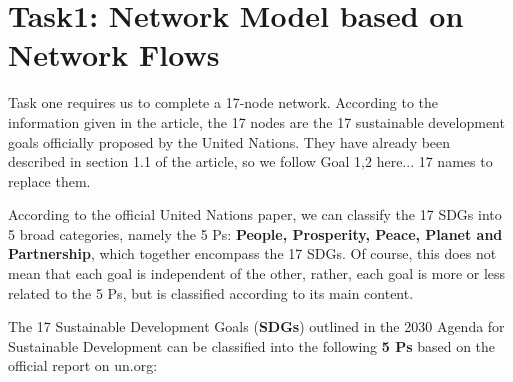 

\section{Task1: Network Model based on Network Flows}%
Task one requires us to complete a 17-node network. According to the information given in the article, the 17 nodes are the 17 sustainable development goals officially proposed by the United Nations. They have already been described in section 1.1 of the article, so we follow Goal 1,2 here... 17 names to replace them.

According to the official United Nations paper, we can classify the 17 SDGs into 5 broad categories, namely the 5 Ps: \textbf{People, Prosperity, Peace, Planet and Partnership}, which together encompass the 17 SDGs. Of course, this does not mean that each goal is independent of the other, rather, each goal is more or less related to the 5 Ps, but is classified according to its main content.

The 17 Sustainable Development Goals (\textbf{SDGs}) outlined in the 2030 Agenda for Sustainable Development can be classified into the following \textbf{5 Ps} based on the official report on un.org:



